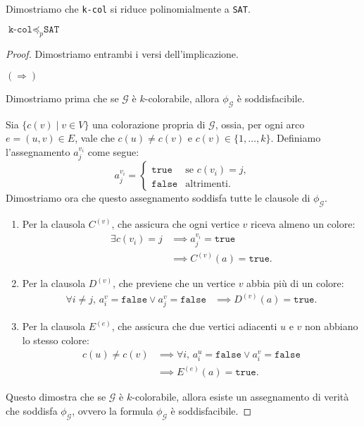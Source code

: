 Dimostriamo che \texttt{k-col} si riduce polinomialmente a \texttt{SAT}.
\begin{theorem}
    $\texttt{k-col} \preceq_p \texttt{SAT}$
\end{theorem}
\begin{proof} Dimostriamo entrambi i versi dell'implicazione.
    
    $(\Rightarrow)$

    
    Dimostriamo prima che se $\mathcal{G}$ è $k$-colorabile, allora $\phi_\mathcal{G}$ è
    soddisfacibile.

    Sia $\{c(v) \mid v \in V\}$ una colorazione propria di $\mathcal{G}$, ossia, per ogni
    arco $e=(u, v) \in E$, vale che $c(u) \neq c(v)$ e $c(v) \in \{1, \ldots, k\}$. Definiamo
    l'assegnamento $a_j^{v_i}$ come segue: 
    \[
    a_j^{v_i} =
    \begin{cases}
        \texttt{true} & \text{se } c(v_i) = j, \\
        \texttt{false} & \text{altrimenti}.
    \end{cases}
    \]
    Dimostriamo ora che questo assegnamento soddisfa tutte le clausole di $\phi_\mathcal{G}$.
    \begin{enumerate}
        \item Per la clausola $C^{(v)}$, che assicura che ogni vertice $v$ riceva almeno un colore:
        \begin{align*}
            \exists c(v_i) = j & \implies a_j^{v_i} = \texttt{true} \\
            & \implies C^{(v)}(a) = \texttt{true}.
        \end{align*}
        
        \item Per la clausola $D^{(v)}$, che previene che un vertice $v$ abbia più di un colore:
        \begin{align*}
            \forall i \neq j, \, a_i^{v} = \texttt{false} \lor a_j^{v} = \texttt{false} & \implies
            D^{(v)}(a) = \texttt{true}.
        \end{align*}
        
        \item Per la clausola $E^{(e)}$, che assicura che due vertici adiacenti $u$ e $v$ non
        abbiano lo stesso colore:
        \begin{align*}
            c(u) \neq c(v) & \implies \forall i, \, a_i^{u} = \texttt{false} \lor a_i^{v} =
            \texttt{false} \\
            & \implies E^{(e)}(a) = \texttt{true}.
        \end{align*}
    \end{enumerate}
    Questo dimostra che se $\mathcal{G}$ è $k$-colorabile, allora esiste un assegnamento
    di verità che soddisfa $\phi_\mathcal{G}$, ovvero la formula $\phi_\mathcal{G}$ è soddisfacibile.


\end{proof}
